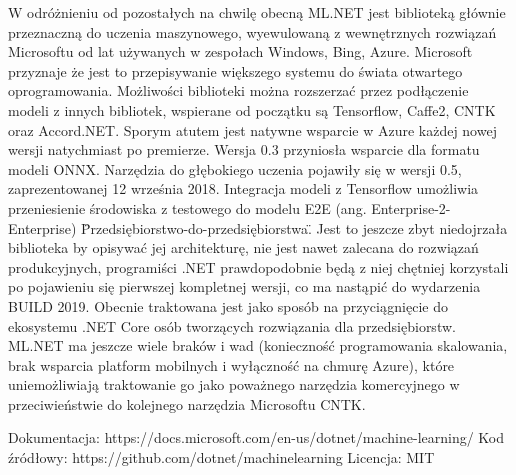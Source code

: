 \documentclass[12pt,a4paper,twoside,titlepage,openright]{book}
\begin{document}
W odróżnieniu od pozostałych na chwilę obecną ML.NET jest biblioteką głównie przeznaczną do uczenia maszynowego, wyewulowaną z wewnętrznych rozwiązań Microsoftu od lat używanych w zespołach Windows, Bing, Azure. Microsoft przyznaje że jest to przepisywanie większego systemu do świata otwartego oprogramowania. \cite{https://blogs.msdn.microsoft.com/dotnet/2018/05/07/introducing-ml-net-cross-platform-proven-and-open-source-machine-learning-framework/} Możliwości biblioteki można rozszerzać przez podłączenie modeli z innych bibliotek, wspierane od początku są Tensorflow, Caffe2, CNTK oraz Accord.NET. Sporym atutem jest natywne wsparcie w Azure każdej nowej wersji natychmiast po premierze. Wersja 0.3 przyniosła wsparcie dla formatu modeli ONNX. Narzędzia do głębokiego uczenia pojawiły się w wersji 0.5, zaprezentowanej 12 września 2018. Integracja modeli z Tensorflow umożliwia przeniesienie środowiska z testowego do modelu E2E (ang. Enterprise-2-Enterprise) \"Przedsiębiorstwo-do-przedsiębiorstwa\". Jest to jeszcze zbyt niedojrzała biblioteka by opisywać jej architekturę, nie jest nawet zalecana do rozwiązań produkcyjnych, programiści .NET prawdopodobnie będą z niej chętniej korzystali po pojawieniu się pierwszej kompletnej wersji, co ma nastąpić do wydarzenia BUILD 2019. Obecnie traktowana jest jako sposób na przyciągnięcie do ekosystemu .NET Core osób tworzących rozwiązania dla przedsiębiorstw. ML.NET ma jeszcze wiele braków i wad (konieczność programowania skalowania, brak wsparcia platform mobilnych i wyłączność na chmurę Azure), które uniemożliwiają traktowanie go jako poważnego narzędzia komercyjnego w przeciwieństwie do kolejnego narzędzia Microsoftu CNTK.

\noindent
\newline
Dokumentacja: https://docs.microsoft.com/en-us/dotnet/machine-learning/
\newline
Kod źródłowy: https://github.com/dotnet/machinelearning
\newline
Licencja: MIT
\end{document}
